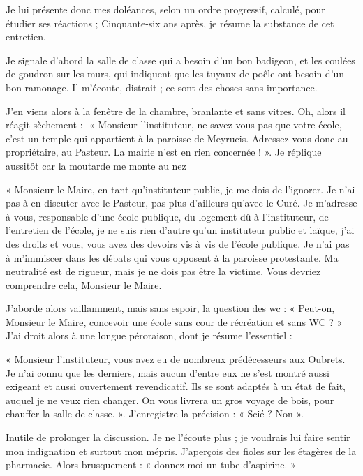 Je lui présente donc mes doléances, selon un ordre progressif, calculé, pour étudier
ses réactions ; Cinquante-six ans après, je résume la substance de cet entretien.

Je signale d’abord la salle de classe qui a besoin d’un bon badigeon, et les coulées de
goudron sur les murs, qui indiquent que les tuyaux de poêle ont besoin d’un bon
ramonage. Il m’écoute, distrait ; ce sont des choses sans importance.

J’en viens alors à la fenêtre de la chambre, branlante et sans vitres. Oh, alors il réagit
sèchement :
-« Monsieur l’instituteur, ne savez vous pas que votre école, c’est un temple qui
appartient à la paroisse de Meyrueis. Adressez vous donc au propriétaire, au Pasteur.
La mairie n’est en rien concernée ! ».
Je réplique aussitôt car la moutarde me monte au nez

« Monsieur le Maire, en tant qu’instituteur public, je me dois de l’ignorer. Je n’ai pas
à en discuter avec le Pasteur, pas plus d’ailleurs qu’avec le Curé. Je m’adresse à
vous, responsable d’une école publique, du logement dû à l’instituteur, de l’entretien
de l’école, je ne suis rien d’autre qu’un instituteur public et laïque, j’ai des droits et
vous, vous avez des devoirs vis à vis de l’école publique. Je n’ai pas à m’immiscer
dans les débats qui vous opposent à la paroisse protestante. Ma neutralité est de
rigueur, mais je ne dois pas être la victime. Vous devriez comprendre cela, Monsieur
le Maire.

J’aborde alors vaillamment, mais sans espoir, la question des wc :
« Peut-on, Monsieur le Maire, concevoir une école sans cour de récréation et sans
WC ? »
J’ai droit alors à une longue péroraison, dont je résume l’essentiel :

« Monsieur l’instituteur, vous avez eu de nombreux prédécesseurs aux Oubrets. Je
n’ai connu que les derniers, mais aucun d’entre eux ne s’est montré aussi exigeant et
aussi ouvertement revendicatif. Ils se sont adaptés à un état de fait, auquel je ne veux
rien changer.
On vous livrera un gros voyage de bois, pour chauffer la salle de classe. ».
J’enregistre la précision : « Scié ? Non ».

Inutile de prolonger la discussion. Je ne l’écoute plus ; je voudrais lui faire sentir mon
indignation et surtout mon mépris. J’aperçois des fioles sur les étagères de la
pharmacie. Alors brusquement :
« donnez moi un tube d’aspirine. »


